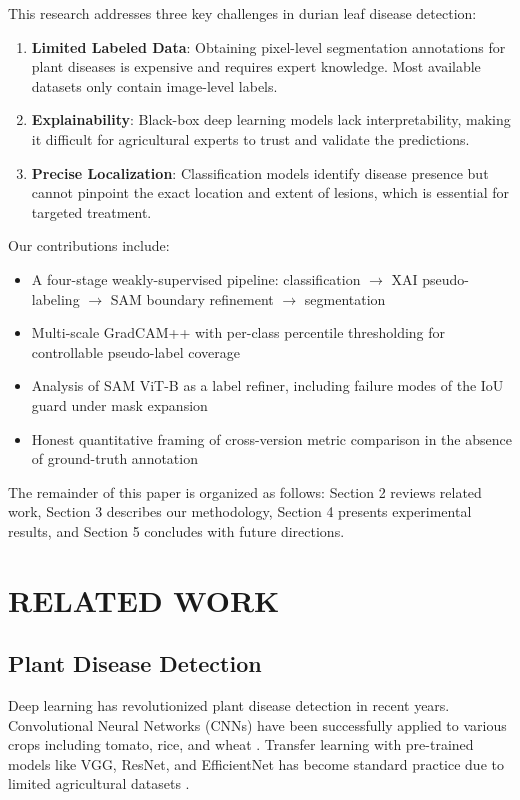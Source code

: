 \documentclass[10pt,a4paper]{article}
\begin{document}
This research addresses three key challenges in durian leaf disease detection:

\begin{enumerate}
\item \textbf{Limited Labeled Data}: Obtaining pixel-level segmentation annotations for plant diseases is expensive and requires expert knowledge. Most available datasets only contain image-level labels.

\item \textbf{Explainability}: Black-box deep learning models lack interpretability, making it difficult for agricultural experts to trust and validate the predictions.

\item \textbf{Precise Localization}: Classification models identify disease presence but cannot pinpoint the exact location and extent of lesions, which is essential for targeted treatment.
\end{enumerate}

Our contributions include:

\begin{itemize}
\item A four-stage weakly-supervised pipeline: classification $\to$ XAI pseudo-labeling $\to$ SAM boundary refinement $\to$ segmentation
\item Multi-scale GradCAM++ with per-class percentile thresholding for controllable pseudo-label coverage
\item Analysis of SAM ViT-B as a label refiner, including failure modes of the IoU guard under mask expansion
\item Honest quantitative framing of cross-version metric comparison in the absence of ground-truth annotation
\end{itemize}

The remainder of this paper is organized as follows: Section 2 reviews related work, Section 3 describes our methodology, Section 4 presents experimental results, and Section 5 concludes with future directions.

\section{RELATED WORK}

\subsection{Plant Disease Detection}

Deep learning has revolutionized plant disease detection in recent years. Convolutional Neural Networks (CNNs) have been successfully applied to various crops including tomato, rice, and wheat \cite{mohanty2016using, ferentinos2018deep}. Transfer learning with pre-trained models like VGG, ResNet, and EfficientNet has become standard practice due to limited agricultural datasets \cite{tan2019efficientnet}.
\end{document}
